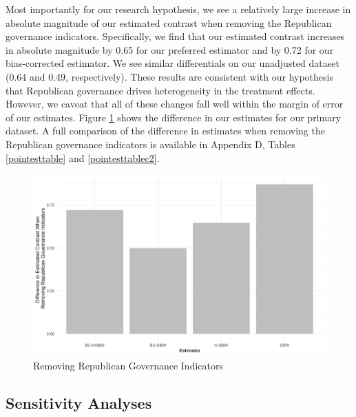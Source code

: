 \documentclass[12pt]{article}
\begin{document}
Most importantly for our research hypothesis, we see a relatively large increase in absolute magnitude of our estimated contrast when removing the Republican governance indicators. Specifically, we find that our estimated contrast increases in absolute magnitude by 0.65 for our preferred estimator and by 0.72 for our bias-corrected estimator. We see similar differentials on our unadjusted dataset (0.64 and 0.49, respectively). These results are consistent with our hypothesis that Republican governance drives heterogeneity in the treatment effects. However, we caveat that all of these changes fall well within the margin of error of our estimates. Figure \ref{repub} shows the difference in our estimates for our primary dataset. A full comparison of the difference in estimates when removing the Republican governance indicators is available in Appendix D, Tables \ref{pointesttable} and \ref{pointesttablec2}.

\begin{figure}[]
\begin{center}
    \includegraphics[scale=0.6]{01_Plots/repub-diff-c1.png}
    \caption{Removing Republican Governance Indicators}
    \label{repub}
\end{center}
\end{figure}


\subsection{Sensitivity Analyses}
\end{document}
